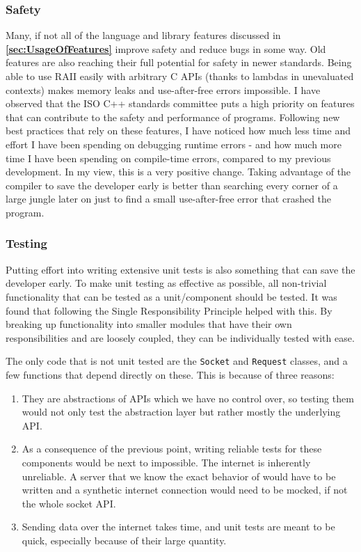 \documentclass[12pt, a4paper]{article}
\begin{document}
\subsubsection{Safety}
Many, if not all of the language and library features discussed in \textbf{\ref{sec:UsageOfFeatures}} improve safety and reduce bugs in some way. Old features are also reaching their full potential for safety in newer standards. Being able to use RAII easily with arbitrary C APIs (thanks to lambdas in unevaluated contexts) makes memory leaks and use-after-free errors impossible. I have observed that the ISO C++ standards committee puts a high priority on features that can contribute to the safety and performance of programs. Following new best practices that rely on these features, I have noticed how much less time and effort I have been spending on debugging runtime errors - and how much more time I have been spending on compile-time errors, compared to my previous development. In my view, this is a very positive change. Taking advantage of the compiler to save the developer early is better than searching every corner of a large jungle later on just to find a small use-after-free error that crashed the program. 

\subsubsection{Testing}
Putting effort into writing extensive unit tests is also something that can save the developer early. To make unit testing as effective as possible, all non-trivial functionality that can be tested as a unit/component should be tested. It was found that following the Single Responsibility Principle helped with this. By breaking up functionality into smaller modules that have their own responsibilities and are loosely coupled, they can be individually tested with ease. 

The only code that is not unit tested are the \texttt{Socket} and \texttt{Request} classes, and a few functions that depend directly on these. This is because of three reasons:

\begin{enumerate}
	\item They are abstractions of APIs which we have no control over, so testing them would not only test the abstraction layer but rather mostly the underlying API.
	\item As a consequence of the previous point, writing reliable tests for these components would be next to impossible. The internet is inherently unreliable. A server that we know the exact behavior of would have to be written and a synthetic internet connection would need to be mocked, if not the whole socket API.
	\item Sending data over the internet takes time, and unit tests are meant to be quick, especially because of their large quantity.
\end{enumerate}
\end{document}
